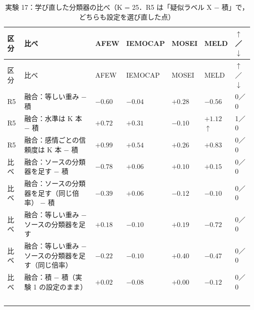 \begin{longtable}{>{\raggedright}p{0.75cm}>{\raggedright}p{5.6cm}>{\raggedright}p{2.05cm}>{\raggedright}p{2.05cm}>{\raggedright}p{2.05cm}>{\raggedright}p{2.05cm}p{0.75cm}}
\caption{実験 17：学び直した分類器の比べ（K = 25．R5 は「疑似ラベル X − 積」で，どちらも設定を選び直した点）}\\
\toprule
区分 & 比べ & AFEW & IEMOCAP & MOSEI & MELD & $\uparrow$／$\downarrow$ \\
\midrule
\endfirsthead
\toprule
区分 & 比べ & AFEW & IEMOCAP & MOSEI & MELD & $\uparrow$／$\downarrow$ \\
\midrule
\endhead
\bottomrule
\endfoot

R5 & 融合：等しい重み − 積 & $-0.60$\newline{\tiny [$-$1.5, $+$0.3]} & $-0.04$\newline{\tiny [$-$0.6, $+$0.5]} & $+0.28$\newline{\tiny [$-$0.3, $+$0.8]} & $-0.56$\newline{\tiny [$-$1.3, $+$0.2]} & 0／0 \\
R5 & 融合：水準は K 本 − 積 & $+0.72$\newline{\tiny [$-$0.1, $+$1.5]} & $+0.31$\newline{\tiny [$-$0.3, $+$1.0]} & $-0.10$\newline{\tiny [$-$0.6, $+$0.4]} & $+1.12$$\uparrow$\newline{\tiny [$+$0.5, $+$1.8]} & 1／0 \\
R5 & 融合：感情ごとの信頼度は K 本 − 積 & $+0.99$\newline{\tiny [$+$0.2, $+$1.8]} & $+0.54$\newline{\tiny [$-$0.0, $+$1.1]} & $+0.26$\newline{\tiny [$-$0.4, $+$0.9]} & $+0.83$\newline{\tiny [$+$0.1, $+$1.6]} & 0／0 \\
比べ & 融合：ソースの分類器を足す − 積 & $-0.78$ & $+0.06$ & $+0.10$ & $+0.15$ & 0／0 \\
比べ & 融合：ソースの分類器を足す（同じ倍率） − 積 & $-0.39$ & $+0.06$ & $-0.12$ & $-0.10$ & 0／0 \\
比べ & 融合：等しい重み − ソースの分類器を足す & $+0.18$ & $-0.10$ & $+0.19$ & $-0.72$ & 0／0 \\
比べ & 融合：等しい重み − ソースの分類器を足す（同じ倍率） & $-0.22$ & $-0.10$ & $+0.40$ & $-0.47$ & 0／0 \\
比べ & 融合：積 − 積（実験 1 の設定のまま） & $+0.02$ & $-0.08$ & $+0.00$ & $-0.12$ & 0／0 \\
$$
\end{longtable}
